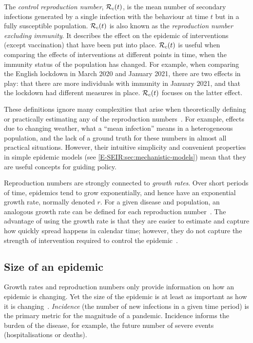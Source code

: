 \documentclass[thesis.tex]{subfiles}
\begin{document}
The \emph{control reproduction number}, $\mathcal{R}_{c}(t)$, is the mean number of secondary infections generated by a single infection with the behaviour at time $t$ but in a fully susceptible population.
$\mathcal{R}_{c}(t)$ is also known as the \emph{reproduction number excluding immunity}.
It describes the effect on the epidemic of interventions (except vaccination) that have been put into place.
$\mathcal{R}_{c}(t)$ is useful when comparing the effects of interventions at different points in time, when the immunity status of the population has changed.
For example, when comparing the English lockdown in March 2020 and January 2021, there are two effects in play: that there are more individuals with immunity in January 2021, and that the lockdown had different measures in place.
$\mathcal{R}_{c}(t)$ focuses on the latter effect.

These definitions ignore many complexities that arise when theoretically defining or practically estimating any of the reproduction numbers~\autocite{pellisEstimation}.
For example, effects due to changing weather, what a ``mean infection'' means in a heterogeneous population, and the lack of a ground truth for these numbers in almost all practical situations.
However, their intuitive simplicity and convenient properties in simple epidemic models (see \cref{E-SEIR:sec:mechanistic-models}) mean that they are useful concepts for guiding policy.

Reproduction numbers are strongly connected to \emph{growth rates}.
Over short periods of time, epidemics tend to grow exponentially, and hence have an exponential growth rate, normally denoted $r$.
For a given disease and population, an analogous growth rate can be defined for each reproduction number~\autocite{pellisEstimation,paragGrowthRates,wallingaGI}.
The advantage of using the growth rate is that they are easier to estimate and capture how quickly spread happens in calendar time; however, they do not capture the strength of intervention required to control the epidemic~\autocite{royalSocietyRnumber}.

\subsection{Size of an epidemic}

Growth rates and reproduction numbers only provide information on how an epidemic is changing.
Yet the size of the epidemic is at least as important as how it is changing~\autocite{pellisEstimation}.
\emph{Incidence} (the number of new infections in a given time period) is the primary metric for the magnitude of a pandemic.
Incidence informs the burden of the disease, for example, the future number of severe events (hospitalisations or deaths).
\end{document}
